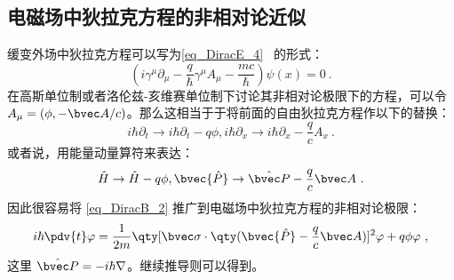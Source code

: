 \subsection{电磁场中狄拉克方程的非相对论近似}
缓变外场中狄拉克方程可以写为\autoref{eq_DiracE_4}~ 的形式：
\begin{equation}
(i\gamma^\mu \partial_\mu -\frac{q}{\hbar}\gamma^\mu A_\mu - \frac{mc}{\hbar})\psi(x)=0~.
\end{equation}
在高斯单位制或者洛伦兹-亥维赛单位制下讨论其非相对论极限下的方程，可以令 $A_\mu=(\phi,-\bvec A/c)$。那么这相当于于将前面的自由狄拉克方程作以下的替换：
\begin{equation}
i\hbar \partial_t \rightarrow i\hbar\partial_t -q\phi, i\hbar\partial_x\rightarrow i\hbar\partial_x - \frac{q}{c}A_x~.
\end{equation}
或者说，用能量动量算符来表达：
\begin{equation}
\hat H\rightarrow \hat H-q\phi,\bvec{\hat P}\rightarrow \hat {\bvec P}-\frac{q}{c}\bvec A~.
\end{equation}
因此很容易将 \autoref{eq_DiracB_2} 推广到电磁场中狄拉克方程的非相对论极限：
\begin{equation}\label{eq_DiracB_3}
i\hbar\pdv{t} \varphi = \frac{1}{2m}\qty[\bvec \sigma \cdot\qty(\bvec {\hat P} - \frac{q}{c}\bvec A)]^2 \varphi + q\phi  \varphi~,
\end{equation}
这里 $\hat{\bvec P}=-i\hbar\nabla$。继续推导则可以得到。
